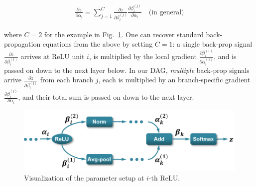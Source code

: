 \documentclass[10pt,twocolumn,letterpaper]{article}
\begin{document}
\begin{align}
\frac{\partial z}{\partial \alpha_i}=\sum_{j=1}^{C}\frac{\partial z}{\partial \beta_i^{(j)}}\frac{\partial \beta_i^{(j)}}{\partial \alpha_i} \quad \text {(in general)} \label{eq:backprop1}
\end{align}

\noindent where $C=2$ for the example in Fig.~\ref{fig:backprop_eq}. One can recover standard back-propagation equations from the above by setting $C=1$: a single back-prop signal $\frac{\partial z}{\partial \beta_i^{(1)}}$  arrives at ReLU unit $i$, is multiplied by the local gradient $\frac{\partial \beta_i^{(1)}}{\partial \alpha_i^{(1)}}$, and is passed on down to the next layer below. In our DAG, {\em multiple} back-prop signals arrive $\frac{\partial z}{\partial \beta_i^{(j)}}$ from each branch $j$, each is multiplied by an branch-specific gradient $\frac{\partial \beta_i^{(j)}}{\partial \alpha_i}$, and their total sum is passed on down to the next layer.


\begin{figure}[htbp]
\centering
	\includegraphics[width=\columnwidth]{fig/fig_backprop_eq.png}
\caption{Visualization of the parameter setup at $i$-th ReLU.}

\label{fig:backprop_eq}
\end{figure}
\end{document}
